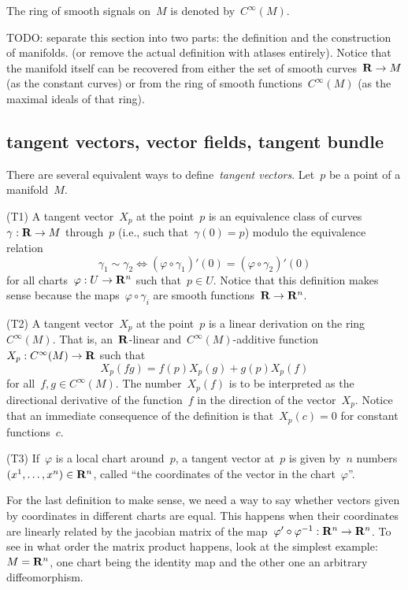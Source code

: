 The ring of smooth signals on~$M$ is denoted by~$C^\infty(M)$.

TODO: separate this section into two parts: the definition and the
construction of manifolds.  (or remove the actual definition with atlases
entirely).  Notice that the manifold itself can be recovered from either the
set of smooth curves~$\mathbf{R}\to M$ (as the constant curves) or from the ring of
smooth functions~$C^\infty(M)$ (as the maximal ideals of that ring).

\subsection{tangent vectors, vector fields, tangent bundle}

There are several equivalent ways to define~\emph{tangent vectors}.
Let~$p$ be a point of a manifold~$M$.

(T1) A tangent vector~$X_p$ at the point~$p$ is an equivalence class of
curves~$\gamma:\mathbf{R}\to M$ through~$p$ (i.e., such that~$\gamma(0)=p$)
modulo the equivalence relation
\[
	\gamma_1\sim\gamma_2
	\iff
		(\varphi\circ\gamma_1)'(0)=(\varphi\circ\gamma_2)'(0)
\]
for all charts~$\varphi:U\to\mathbf{R}^n$ such that~$p\in U$.  Notice that this
definition makes sense because the maps~$\varphi\circ\gamma_i$ are smooth
functions~$\mathbf{R}\to\mathbf{R}^n$.

(T2) A tangent vector~$X_p$ at the point~$p$ is a linear derivation on the
ring~$C^\infty(M)$.  That is, an~$\mathbf{R}$-linear and~$C^\infty(M)$-additive
function~$X_p:C^\infty(M)\to\mathbf{R}$ such that
\[
	X_p(fg)=f(p)X_p(g) + g(p)X_p(f)
\]
for all~$f,g\in C^\infty(M)$.  The number~$X_p(f)$ is to be interpreted as
the directional derivative of the function~$f$ in the direction of the
vector~$X_p$.  Notice that an immediate consequence of the definition is
that~$X_p(c)=0$ for constant functions~$c$.

(T3) If~$\varphi$ is a local chart around~$p$, a tangent vector at~$p$ is
given by~$n$ numbers~$(x^1,\ldots,x^n)\in\mathbf{R}^n$, called ``the coordinates of
the vector in the chart~$\varphi$''.

For the last definition to make sense, we need a way to say whether vectors
given by coordinates in different charts are equal.  This happens when their
coordinates are linearly related by the jacobian matrix of the
map~$\varphi'\circ\varphi^{-1}:\mathbf{R}^n\to\mathbf{R}^n$.  To see in what order the matrix
product happens, look at the simplest example:~$M=\mathbf{R}^n$, one chart being the
identity map and the other one an arbitrary diffeomorphism.


